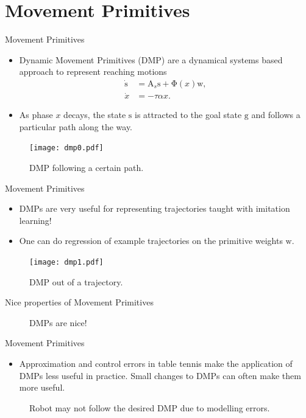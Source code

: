 \documentclass[handout]{beamer}
\newcommand{\boldvec}[1]{\boldsymbol{\mathrm{#1}}}
\let\vec\boldvec
\newcommand{\dmp}{\vec{s}} %
\newcommand{\goal}{\vec{g}} %
\newcommand{\phase}{x} %
\newcommand{\weights}{\vec{w}} %
\newcommand{\basis}{\vec{\Phi}} %
\begin{document}
\section{Movement Primitives}
%
\begin{frame}{Movement Primitives}
\begin{itemize}
\item Dynamic Movement Primitives (DMP) are a dynamical systems based approach to represent reaching motions
\begin{equation}
\begin{aligned}
\dot{\dmp} &= \vec{A}_s \dmp + \basis(\phase) \weights, \\
\dot{\phase} &= -\tau\alpha\phase.
\label{dmp1}
\end{aligned}
\end{equation}
\item As phase $\phase$ decays, the state $\dmp$ is attracted to the goal state $\goal$ and follows a particular path along the way.
\end{itemize}
\begin{figure}
\center
\texttt{[image: dmp0.pdf]}			
\caption{DMP following a certain path.}
\end{figure}
\end{frame}
%
\begin{frame}{Movement Primitives}
\begin{itemize}
\item DMPs are very useful for representing trajectories taught with imitation learning! 
\item One can do regression of example trajectories on the primitive weights $\weights$.
\end{itemize}
\begin{figure}
\center
\texttt{[image: dmp1.pdf]}			
\caption{DMP out of a trajectory.}
\end{figure}
\end{frame}
%
\begin{frame}{Nice properties of Movement Primitives}
\begin{figure}[ht]
\centering
{}
\caption{DMPs are nice!} 
\label{niceDMPs} 
\end{figure}
\end{frame}
%
\begin{frame}{Movement Primitives}
\begin{itemize}
\item Approximation and control errors in table tennis make the application of DMPs less useful in practice. Small changes to DMPs can often make them more useful.
\end{itemize}
\begin{figure}
\centering
\def\svgwidth{150pt}

\caption{Robot may not follow the desired DMP due to modelling errors.}
\end{figure}
\end{frame}
\end{document}
